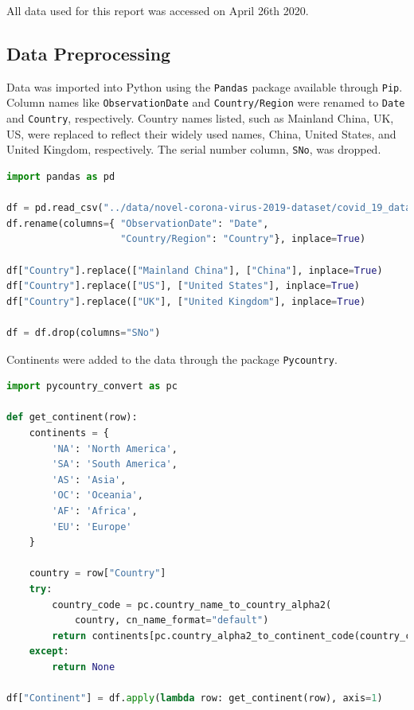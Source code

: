 \documentclass{homework}
\begin{document}
All data used for this report was accessed on April 26th 2020.

\subsection{Data Preprocessing}

Data was imported into Python using the \texttt{Pandas} package available through \texttt{Pip}. Column names like \texttt{ObservationDate} and \texttt{Country/Region} were renamed to \texttt{Date} and \texttt{Country}, respectively. Country names listed, such as Mainland China, UK, US, were replaced to reflect their widely used names, China, United States, and United Kingdom, respectively. The serial number column, \texttt{SNo}, was dropped.

\begin{lstlisting}[language=Python, caption={Importing COVID19 dataset}]
import pandas as pd

df = pd.read_csv("../data/novel-corona-virus-2019-dataset/covid_19_data.csv", parse_dates=["Last Update"])
df.rename(columns={ "ObservationDate": "Date",
                    "Country/Region": "Country"}, inplace=True)

df["Country"].replace(["Mainland China"], ["China"], inplace=True)
df["Country"].replace(["US"], ["United States"], inplace=True)
df["Country"].replace(["UK"], ["United Kingdom"], inplace=True)

df = df.drop(columns="SNo")
\end{lstlisting}

\newpage
Continents were added to the data through the package \texttt{Pycountry}.

\begin{lstlisting}[language=Python, caption={Adding continent data}]
import pycountry_convert as pc

def get_continent(row):
    continents = {
        'NA': 'North America',
        'SA': 'South America',
        'AS': 'Asia',
        'OC': 'Oceania',
        'AF': 'Africa',
        'EU': 'Europe'
    }

    country = row["Country"]
    try:
        country_code = pc.country_name_to_country_alpha2(
            country, cn_name_format="default")
        return continents[pc.country_alpha2_to_continent_code(country_code)]
    except:
        return None

df["Continent"] = df.apply(lambda row: get_continent(row), axis=1)
\end{lstlisting}
\end{document}
